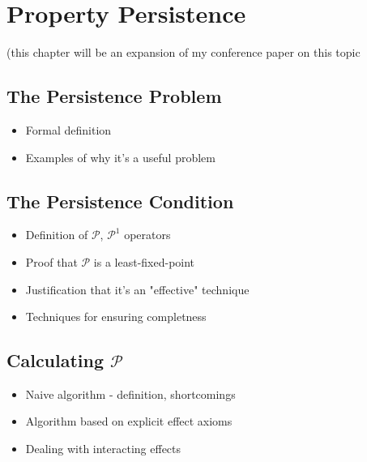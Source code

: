 \chapter{Property Persistence}\label{ch:persistence}
\minitoc
\onehalfspace   %

(this chapter will be an expansion of my conference paper on this topic \cite{kelly07sc_persistence}


\section{The Persistence Problem}

\begin{itemize}
\item Formal definition
\item Examples of why it's a useful problem
\end{itemize}

\section{The Persistence Condition}

\begin{itemize}
\item Definition of $\mathcal{P}$, $\mathcal{P}^{1}$ operators
\item Proof that $\mathcal{P}$ is a least-fixed-point
\item Justification that it's an "effective" technique
\item Techniques for ensuring completness
\end{itemize}

\section{Calculating $\mathcal{P}$}

\begin{itemize}
\item Naive algorithm - definition, shortcomings
\item Algorithm based on explicit effect axioms
\item Dealing with interacting effects
\end{itemize}


